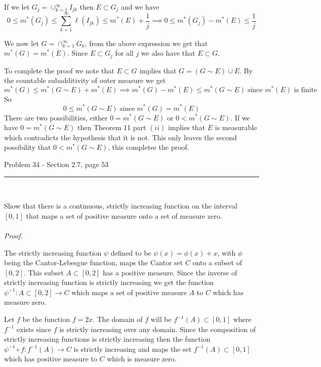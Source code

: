 \documentclass[11pt,reqno]{article}
\begin{document}
\noindent If we let $G_j = \cup_{k = 1}^\infty I_{jk}$ then $E \subset G_j$ and we have 
\[ 0 \le m^*(G_j) \le \sum_{k=1}^\infty \ell(I_{jk}) \le m^*(E) + \frac{1}{j} \implies 0 \le m^*(G_j) - m^*(E) \le \frac{1}{j} \]

\noindent We now let $G = \cap_{k = 1}^\infty G_k$, from the above expression we get that $m^*(G) = m^*(E)$. Since $E \subset G_j$ for all $j$ we also have that $E \subset G$.

To complete the proof we note that $E \subset G$ implies that $G = (G \sim E) \cup E$. By the countable subadditivity of outer measure we get 
\[ m^*(G) \le m^*(G \sim E) + m^*(E) \implies m^*(G) - m^*(E) \le m^*(G \sim E) \; \text{since $m^*(E)$ is finite} \]
\noindent So
\[ 0 \le m^*(G \sim E) \; \text{since} \; m^*(G) = m^*(E) \]
There are two possibilities, either $0 = m^*(G \sim E)$ or $0 < m^*(G \sim E)$. If we have $0 = m^*(G \sim E)$ then Theorem 11 part $(ii)$ implies that $E$ is measurable which contradicts the hypothesis that it is not. This only leaves the second possibility that $0 < m^*(G \sim E)$, this completes the proof.


\begin{flushleft} 
Problem 34 - Section 2.7, page 53\\
\rule{500pt}{1pt}\\
\end{flushleft} 

Show that there is a continuous, strictly increasing function on the interval $[0,1]$ that maps a set of positive measure onto a set of measure zero.
\\\\ \emph{Proof.}

The strictly increasing function $\psi$ defined to be $\psi(x) = \phi(x) + x$, with $\phi$ being the Cantor-Lebesgue function, maps the Cantor set $C$ onto a subset of $[0,2]$. This subset $A \subset [0,2]$ has a positive measure. Since the inverse of strictly increasing function is strictly increasing we get the function $\psi^{-1}: A \subset [0,2] \to C$ which maps a set of positive measure $A$ to $C$ which has measure zero.

Let $f$ be the function $f = 2 x$. The domain of $f$ will be $f^{-1}(A) \subset [0,1]$ where $f^{-1}$ exists since $f$ is strictly increasing over any domain. Since the composition of strictly increasing functions is strictly increasing then the function $\psi^{-1} \circ f : f^{-1}(A) \to C$ is strictly increasing and maps the set $f^{-1}(A) \subset [0,1]$ which has positive measure to $C$ which is measure zero.
\end{document}
